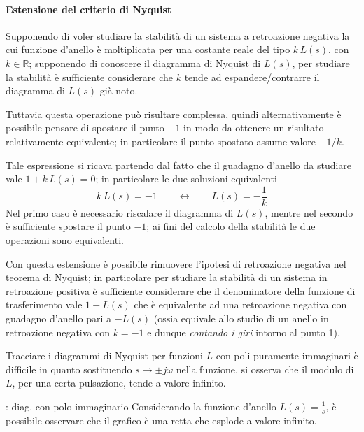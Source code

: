 		\paragraph{Estensione del criterio di Nyquist} Supponendo di voler studiare la stabilità di un sistema a retroazione negativa la cui funzione d'anello è moltiplicata per una costante reale del tipo $k\,L(s)$, con $k\in\mathds R$; supponendo di conoscere il diagramma di Nyquist di $L(s)$, per studiare la stabilità è sufficiente considerare che $k$ tende ad espandere/contrarre il diagramma di $L(s)$ già noto.
		
		Tuttavia questa operazione può risultare complessa, quindi alternativamente è possibile pensare di spostare il punto $-1$ in modo da ottenere un risultato relativamente equivalente; in particolare il punto spostato assume valore $-1/k$.
		\begin{nota}
			Tale espressione si ricava partendo dal fatto che il guadagno d'anello da studiare vale $1 + k\,L(s) = 0$; in particolare le due soluzioni equivalenti
			\[ k\, L(s) = -1 \qquad \leftrightarrow \qquad L(s) = - \frac 1 k\]
			Nel primo caso è necessario riscalare il diagramma di $L(s)$, mentre nel secondo è sufficiente spostare il punto $-1$; ai fini del calcolo della stabilità le due operazioni sono equivalenti.
		\end{nota} 
	
		Con questa estensione è possibile rimuovere l'ipotesi di retroazione negativa nel teorema di Nyquist; in particolare per studiare la stabilità di un sistema in retroazione positiva è sufficiente considerare che il denominatore della funzione di trasferimento vale $1 - L(s)$ che è equivalente ad una retroazione negativa con guadagno d'anello pari a $-L(s)$ (ossia equivale allo studio di un anello in retroazione negativa con $k=-1$ e dunque \textit{contando i giri} intorno al punto 1).
		
		\begin{nota}
			Tracciare i diagrammi di Nyquist per funzioni $L$ con poli puramente immaginari è difficile in quanto sostituendo $s\rightarrow \pm j\omega$ nella funzione, si osserva che il modulo di $L$, per una certa pulsazione, tende a valore infinito.
		\end{nota}
		\begin{esempio}{: diag. con polo immaginario}
			Considerando la funzione d'anello $L(s) = \frac 1 s$, è possibile osservare che il grafico è una retta che esplode a valore infinito.
		\end{esempio}
	
